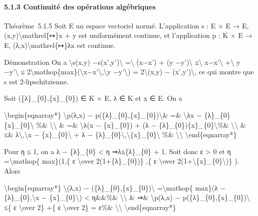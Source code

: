 \documentclass[]{article}
\begin{document}
\paragraph{5.1.3 Continuité des opérations algébriques}

Théorème~5.1.5 Soit E un espace vectoriel normé. L'application s : E × E
→ E, (x,y)\textbackslash{}mathrel\{↦\}x + y est uniformément continue,
et l'application p : K × E → E, (λ,x)\textbackslash{}mathrel\{↦\}λx est
continue.

Démonstration On a \textbackslash{}\textbar{}s(x,y)
−s(x',y')\textbackslash{}\textbar{} =\textbackslash{}\textbar{} (x−x') +
(y −y')\textbackslash{}\textbar{} ≤\textbackslash{}\textbar{}
x−x'\textbackslash{}\textbar{} +\textbackslash{}\textbar{} y
−y'\textbackslash{}\textbar{} ≤
2\textbackslash{}mathop\{max\}(\textbackslash{}\textbar{}x−x'\textbackslash{}\textbar{},\textbackslash{}\textbar{}y
−y'\textbackslash{}\textbar{}) = 2\textbackslash{}\textbar{}(x,y) −
(x',y')\textbackslash{}\textbar{}, ce qui montre que s est
2-lipschitzienne.

Soit (\{λ\}\_\{0\},\{x\}\_\{0\}) ∈ K × E, λ ∈ K et x ∈ E. On a

\textbackslash{}begin\{eqnarray*\} \textbackslash{}\textbar{}p(λ,x) −
p(\{λ\}\_\{0\},\{x\}\_\{0\})\textbackslash{}\textbar{}\& =\&
\textbackslash{}\textbar{}λx −
\{λ\}\_\{0\}\{x\}\_\{0\}\textbackslash{}\textbar{} \%\&
\textbackslash{}\textbackslash{} \& =\& \textbackslash{}\textbar{}λ(x −
\{x\}\_\{0\}) + (λ −
\{λ\}\_\{0\})\{x\}\_\{0\}\textbackslash{}\textbar{}\%\&
\textbackslash{}\textbackslash{} \& ≤\&
\textbar{}λ\textbar{}\textbackslash{},\textbackslash{}\textbar{}x −
\{x\}\_\{0\}\textbackslash{}\textbar{} + \textbar{}λ −
\{λ\}\_\{0\}\textbar{}\textbackslash{},\textbackslash{}\textbar{}\{x\}\_\{0\}\textbackslash{}\textbar{}
\%\& \textbackslash{}\textbackslash{} \textbackslash{}end\{eqnarray*\}

Pour η ≤ 1, on a \textbar{}λ − \{λ\}\_\{0\}\textbar{} \textless{} η
⇒\textbar{}λ\textbar{}≤\textbar{}\{λ\}\_\{0\}\textbar{} + 1. Soit donc ε
\textgreater{} 0 et η =\textbackslash{}mathop\{ max\}(1,\{ ε
\textbackslash{}over 2(1+\textbar{}\{λ\}\_\{0\}\textbar{})\} ,\{ ε
\textbackslash{}over
2(1+\textbackslash{}\textbar{}\{x\}\_\{0\}\textbackslash{}\textbar{})\}
). Alors

\textbackslash{}begin\{eqnarray*\} \textbackslash{}\textbar{}(λ,x) −
(\{λ\}\_\{0\},\{x\}\_\{0\})\textbackslash{}\textbar{}
=\textbackslash{}mathop\{ max\}(\textbar{}λ −
\{λ\}\_\{0\}\textbar{},\textbackslash{}\textbar{}x −
\{x\}\_\{0\}\textbackslash{}\textbar{}) \textless{} η\&\&\%\&
\textbackslash{}\textbackslash{} \& ⇒\& \textbackslash{}\textbar{}p(λ,x)
− p(\{λ\}\_\{0\},\{x\}\_\{0\})\textbackslash{}\textbar{} ≤\{ ε
\textbackslash{}over 2\} +\{ ε \textbackslash{}over 2\} = ε\%\&
\textbackslash{}\textbackslash{} \textbackslash{}end\{eqnarray*\}
\end{document}
